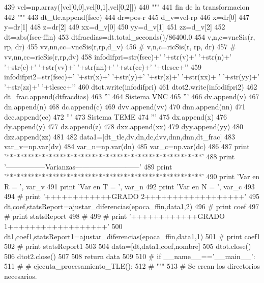 \begin{DoxyCode}
439             vel=np.array([vel[0,0],vel[0,1],vel[0,2]])
440             """
441             fin de la transformacion
442             """
443             dt_tle.append(fsec)
444             dr=pos-r
445             d_v=vel-rp
446             x=dr[0]
447             y=dr[1]
448             z=dr[2]
449             xx=d_v[0]
450             yy=d_v[1]
451             zz=d_v[2]
452             dt=abs(fsec-ffin)
453             dtfracdias=dt.total_seconds()/86400.0
454             v,n,c=vncSis(r, rp, dr)
455             vv,nn,cc=vncSis(r,rp,d_v)
456     #             v,n,c=ricSis(r, rp, dr)
457     #             vv,nn,cc=ricSis(r,rp,dv)
458             infodifpri=str(fsec)+' '+str(v)+' '+str(n)+' '+str(c)+' '+str(vv)+'
       '+str(nn)+' '+str(cc)+' '+tlesec+'\n'
459             infodifpri2=str(fsec)+' '+str(x)+' '+str(y)+' '+str(z)+' '+str(xx)+
      ' '+str(yy)+' '+str(zz)+' '+tlesec+'\n'
460             dtot.write(infodifpri)
461             dtot2.write(infodifpri2)
462             dt_frac.append(dtfracdias)
463             '''
464             Sistema VNC
465             '''
466             dv.append(v)
467             dn.append(n)
468             dc.append(c)
469             dvv.append(vv)
470             dnn.append(nn)
471             dcc.append(cc)
472             '''
473             Sistema TEME
474             '''
475             dx.append(x)
476             dy.append(y)
477             dz.append(z)
478             dxx.append(xx)
479             dyy.append(yy)
480             dzz.append(zz)       
481             
482     data1=[dt_tle,dv,dn,dc,dvv,dnn,dnn,dt_frac]
483     var_v=np.var(dv)
484     var_n=np.var(dn)
485     var_c=np.var(dc)
486     
487     print '*******************************************************'
488     print '-----------------Varianzas---------------------------'
489     print '*******************************************************'
490     print 'Var en R = ', var_v
491     print 'Var en T = ', var_n
492     print 'Var en N = ', var_c
493     
494 #     print '++++++++++++GRADO 2++++++++++++++++++'
495     dt,coef,statsReport=ajustar_diferencias(epoca_ffin,data1,2)
496 #     print coef
497 #     print statsReport
498 #     
499 #     print '++++++++++++GRADO 1++++++++++++++++++'
500     dt1,coef1,statsReport1=ajustar_diferencias(epoca_ffin,data1,1)
501 #     print coef1
502 #     print statsReport1
503 
504     data=[dt,data1,coef,nombre]  
505     dtot.close()
506     dtot2.close() 
507 
508     return data     
509 
510 # if __name__=='__main__':
511 # #    ejecuta_procesamiento_TLE():
512 #     """
513 #     Se crean los directorios necesarios.

\end{DoxyCode}

